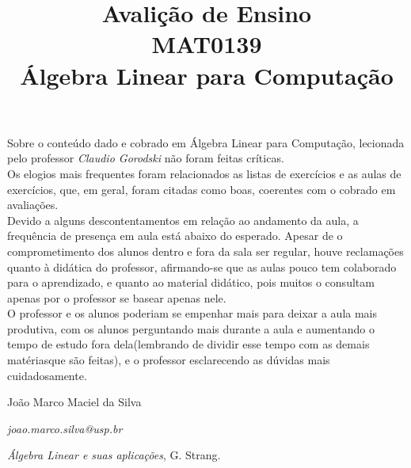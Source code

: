 \documentclass{article}
\date{}
\title{Avalição de Ensino\\
       MAT0139\\
       Álgebra Linear para Computação}
\author{}
\begin{document}
\maketitle
\thispagestyle{empty}

\indent Sobre o conteúdo dado e cobrado em Álgebra Linear para Computação, lecionada pelo professor \textit{Claudio 
Gorodski} não foram feitas críticas.\\
\indent Os elogios mais frequentes foram relacionados as listas de exercícios e as aulas de exercícios, que, em geral,
foram citadas como boas, coerentes com o cobrado em avaliações. \\
\indent Devido a alguns descontentamentos em relação ao andamento da aula, a frequência de presença em aula está abaixo 
do esperado. Apesar de o comprometimento dos alunos dentro e fora da sala ser regular, houve reclamações quanto à 
didática do professor, afirmando-se que as aulas pouco tem colaborado para o aprendizado, e quanto ao material didático, 
pois muitos o consultam apenas por o professor se basear apenas nele.\\
\indent O professor e os alunos poderiam se empenhar mais para deixar a aula mais produtiva, com os alunos perguntando 
mais durante a aula e aumentando o tempo de estudo fora dela(lembrando de dividir esse tempo com as demais matériasque 
são feitas), e o professor esclarecendo as dúvidas mais cuidadosamente.


\vspace{6ex}

João Marco Maciel da Silva

\emph{joao.marco.silva@usp.br}

\vspace{11ex}

\begin{thebibliography}{99}

	 \emph{Álgebra Linear e suas aplicações}, G. Strang.
	
\end{thebibliography}
\end{document}
